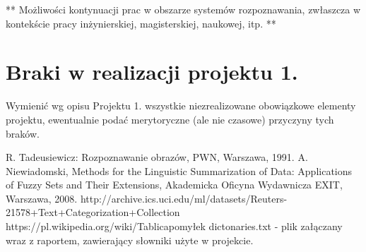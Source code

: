 \documentclass{classrep}
\begin{document}
** Możliwości kontynuacji prac w obszarze systemów rozpoznawania, zwłaszcza w kontekście pracy inżynierskiej,
magisterskiej, naukowej, itp. **\\



\section{Braki w realizacji projektu 1.}
Wymienić wg opisu Projektu 1. wszystkie niezrealizowane obowiązkowe elementy projektu, ewentualnie
podać merytoryczne (ale nie czasowe) przyczyny tych braków. 


\begin{thebibliography}{0}
 R. Tadeusiewicz: Rozpoznawanie obrazów, PWN, Warszawa, 1991.  
 A. Niewiadomski, Methods for the Linguistic Summarization of Data: Applications of Fuzzy Sets and Their Extensions, Akademicka Oficyna Wydawnicza EXIT, Warszawa, 2008.
 http://archive.ics.uci.edu/ml/datasets/Reuters-21578+Text+Categorization+Collection
 https://pl.wikipedia.org/wiki/Tablica\textunderscore pomyłek
 dictonaries.txt - plik załączany wraz z raportem, zawierający słowniki użyte w projekcie.
\end{thebibliography}

\end{document}
